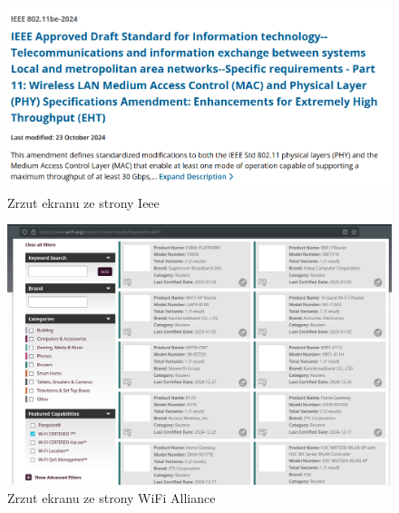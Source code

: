 \documentclass{article}
\begin{document}
            \begin{figure}[ht]
                \centering
                \includegraphics[width=\textwidth]{images/Ieee.png}
                \caption{Zrzut ekranu ze strony Ieee}
                \label{fig:ScIeee}
            \end{figure}
            \FloatBarrier
            \begin{figure}[ht]
                \centering
                \includegraphics[width=\textwidth]{images/WiFiAcertify.png}
                \caption{Zrzut ekranu ze strony WiFi Alliance}
                \label{fig:ScWiFi}
            \end{figure}
            \FloatBarrier
\end{document}
